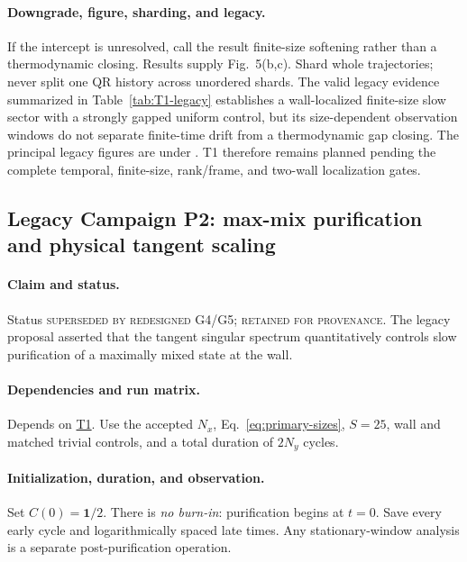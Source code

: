 \documentclass[aps,prx,twocolumn,floatfix,nofootinbib,superscriptaddress,longbibliography]{revtex4-2}
\newcommand{\campref}[1]{\hyperref[camp:#1]{#1}}
\begin{document}
\paragraph*{Downgrade, figure, sharding, and legacy.}
If the intercept is unresolved, call the result finite-size softening rather than a
thermodynamic closing.  Results supply Fig.~5(b,c).  Shard whole trajectories; never split
one QR history across unordered shards.  The valid legacy evidence summarized in
Table~\ref{tab:T1-legacy} establishes a wall-localized finite-size slow sector with a
strongly gapped uniform control, but its size-dependent observation windows do not separate
finite-time drift from a thermodynamic gap closing.  The principal legacy figures are under
.  T1 therefore remains
planned pending the complete temporal, finite-size, rank/frame, and two-wall localization
gates.

\subsection{Legacy Campaign P2: max-mix purification and physical tangent scaling}
\label{camp:P2}
\paragraph*{Claim and status.}
Status \textsc{superseded by redesigned G4/G5; retained for provenance}.  The legacy
proposal asserted that the tangent singular spectrum quantitatively controls slow purification
of a maximally mixed state at the wall.

\paragraph*{Dependencies and run matrix.}
Depends on \campref{T1}.  Use the accepted $N_x$, Eq.~\eqref{eq:primary-sizes}, $S=25$, wall and
matched trivial controls, and a total duration of $2N_y$ cycles.

\paragraph*{Initialization, duration, and observation.}
Set $C(0)=\mathbf{1}/2$.  There is \emph{no burn-in}: purification begins at $t=0$.  Save every
early cycle and logarithmically spaced late times.  Any stationary-window analysis is a
separate post-purification operation.
\end{document}
